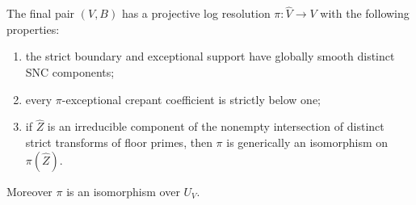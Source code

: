 \begin{lemma}\label{lem:special-resolution}
The final pair \((V,B)\) has a projective log resolution
\(\pi:\widehat V\to V\) with the following properties:
\begin{enumerate}
 \item the strict boundary and exceptional support have globally smooth
 distinct SNC components;
 \item every \(\pi\)-exceptional crepant coefficient is strictly below one;
 \item if \(\widehat Z\) is an irreducible component of the nonempty
 intersection of distinct strict transforms of floor primes, then
 \(\pi\) is generically an isomorphism on \(\pi(\widehat Z)\).
\end{enumerate}
Moreover \(\pi\) is an isomorphism over \(U_V\).
\end{lemma}
